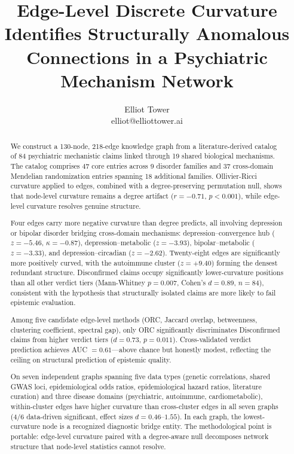\documentclass{article}
\title{Edge-Level Discrete Curvature Identifies Structurally Anomalous Connections in a Psychiatric Mechanism Network}
\author{\name Elliot Tower \\
      \email elliot@elliottower.ai}
\begin{document}
\maketitle

\begin{abstract}
We construct a 130-node, 218-edge knowledge graph from a literature-derived catalog of 84 psychiatric mechanistic claims linked through 19 shared biological mechanisms. The catalog comprises 47 core entries across 9 disorder families and 37 cross-domain Mendelian randomization entries spanning 18 additional families. Ollivier-Ricci curvature applied to edges, combined with a degree-preserving permutation null, shows that node-level curvature remains a degree artifact ($r = -0.71$, $p < 0.001$), while edge-level curvature resolves genuine structure.

Four edges carry more negative curvature than degree predicts, all involving depression or bipolar disorder bridging cross-domain mechanisms: depression--convergence hub ($z = -5.46$, $\kappa = -0.87$), depression--metabolic ($z = -3.93$), bipolar--metabolic ($z = -3.33$), and depression--circadian ($z = -2.62$). Twenty-eight edges are significantly more positively curved, with the autoimmune cluster ($z = +9.40$) forming the densest redundant structure. Disconfirmed claims occupy significantly lower-curvature positions than all other verdict tiers (Mann-Whitney $p = 0.007$, Cohen's $d = 0.89$, $n = 84$), consistent with the hypothesis that structurally isolated claims are more likely to fail epistemic evaluation.

Among five candidate edge-level methods (ORC, Jaccard overlap, betweenness, clustering coefficient, spectral gap), only ORC significantly discriminates Disconfirmed claims from higher verdict tiers ($d = 0.73$, $p = 0.011$). Cross-validated verdict prediction achieves AUC $= 0.61$---above chance but honestly modest, reflecting the ceiling on structural prediction of epistemic quality.

On seven independent graphs spanning five data types (genetic correlations, shared GWAS loci, epidemiological odds ratios, epidemiological hazard ratios, literature curation) and three disease domains (psychiatric, autoimmune, cardiometabolic), within-cluster edges have higher curvature than cross-cluster edges in all seven graphs (4/6 data-driven significant, effect sizes $d = 0.46$--$1.55$). In each graph, the lowest-curvature node is a recognized diagnostic bridge entity. The methodological point is portable: edge-level curvature paired with a degree-aware null decomposes network structure that node-level statistics cannot resolve.
\end{abstract}
\end{document}
